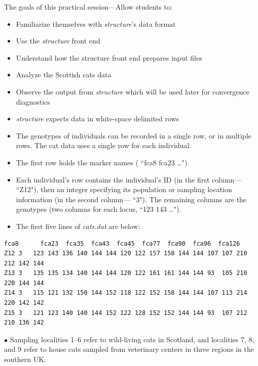 
 
\newcommand{\bY}{{\bm{Y}}}
\newcommand{\bX}{{\bm{X}}}

 
The goals of this practical session---Allow students to:
\begin{itemize}
\item Familiarize themselves with {\em structure}'s data format
\item Use the {\em structure} front end
\item Understand how the structure front end prepares input files 
\item Analyze the Scottish cats data
\item Observe the output from {\em structure} which will be used later for convergence diagnostics
\end{itemize}

\begin{itemize}
\item {\em structure} expects data in white-space delimited rows
\item The genotypes of individuals can be recorded in a single row, or
in multiple rows.  The cat data uses a single row for each individual.
\item The first row holds the marker names (\eg{} ``fca8 fca23 \ldots").
\item Each individual's row contains the individual's ID (in the first column---\eg{} ``Z12"), then an integer specifying its population or sampling location information (in the second column---\eg{} ``3").  The remaining columns are the genotypes (two columns for each locus, \eg{} ``123 143 \ldots").
\item The first five lines of {\sl cats.dat} are below:
\end{itemize} 
{\footnotesize
\begin{verbatim}
fca8      fca23  fca35  fca43  fca45  fca77  fca90  fca96  fca126
Z12 3   123 143 136 140 144 144 120 122 157 158 144 144 107 107 210 212 142 144
Z13 3   135 135 134 140 144 144 120 122 161 161 144 144 93  105 210 220 144 144
Z14 3   115 121 132 150 144 152 118 122 152 158 144 144 107 113 214 220 142 142
Z15 3   121 123 140 140 144 152 122 128 152 152 144 144 93  107 212 210 136 142
\end{verbatim}
}
$\bullet$ Sampling localities 1--6 refer to wild-living cats in Scotland, and localities 7, 8, and 9 refer to house cats sampled from veterinary centers in three regions in the southern UK.



